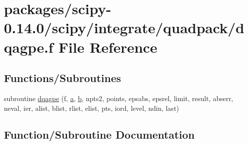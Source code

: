 \hypertarget{dqagpe_8f}{}\section{packages/scipy-\/0.14.0/scipy/integrate/quadpack/dqagpe.f File Reference}
\label{dqagpe_8f}
\subsection*{Functions/\+Subroutines}
\begin{DoxyCompactItemize}
\item 
subroutine \hyperlink{dqagpe_8f_ab6d99ae01de91bf5250781953d1569d9}{dqagpe} (f, \hyperlink{gen__mat5files_8m_aae328bf20413f220e38aec4d95bfd6da}{a}, \hyperlink{gen__mat5files_8m_a7b38767b3b6a8dae167e5afa4fc340b0}{b}, npts2, points, epsabs, epsrel, limit, result, abserr, neval, ier, alist, blist, rlist, elist, pts, iord, level, ndin, last)
\end{DoxyCompactItemize}


\subsection{Function/\+Subroutine Documentation}
\hypertarget{dqagpe_8f_ab6d99ae01de91bf5250781953d1569d9}{}
